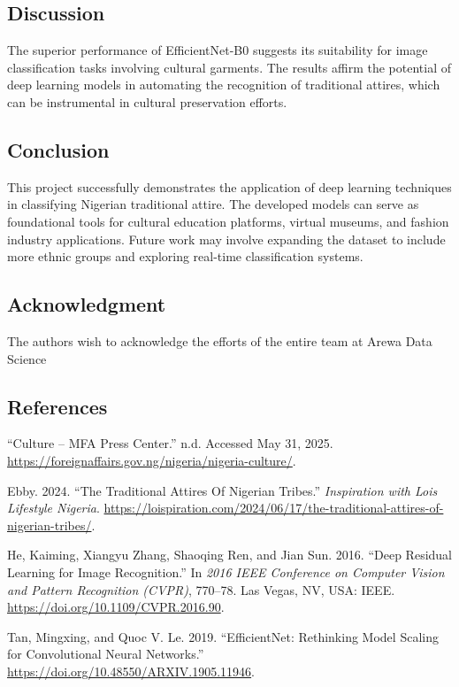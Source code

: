 \documentclass[
  letterpaper,
  DIV=11,
  numbers=noendperiod]{scrartcl}
\newlength{\cslhangindent}
\newenvironment{CSLReferences}[2] %
 {\begin{list}{}{%
  \setlength{\itemindent}{0pt}
  \setlength{\leftmargin}{0pt}
  \setlength{\parsep}{0pt}
  \ifodd #1
   \setlength{\leftmargin}{\cslhangindent}
   \setlength{\itemindent}{-1\cslhangindent}
  \fi
  \setlength{\itemsep}{#2\baselineskip}}}
 {\end{list}}
\begin{document}
\subsection{Discussion}\label{discussion}

The superior performance of EfficientNet-B0 suggests its suitability for
image classification tasks involving cultural garments. The results
affirm the potential of deep learning models in automating the
recognition of traditional attires, which can be instrumental in
cultural preservation efforts.

\subsection{Conclusion}\label{conclusion}

This project successfully demonstrates the application of deep learning
techniques in classifying Nigerian traditional attire. The developed
models can serve as foundational tools for cultural education platforms,
virtual museums, and fashion industry applications. Future work may
involve expanding the dataset to include more ethnic groups and
exploring real-time classification systems.

\subsection*{Acknowledgment}\label{acknowledgment}

The authors wish to acknowledge the efforts of the entire team at Arewa
Data Science

\subsection*{References}\label{references}

\label{refs}
\begin{CSLReferences}{1}{0}
{``Culture -- {MFA} {Press} {Center}.''} n.d. Accessed May 31, 2025.
\url{https://foreignaffairs.gov.ng/nigeria/nigeria-culture/}.

Ebby. 2024. {``The {Traditional} {Attires} {Of} {Nigerian} {Tribes}.''}
\emph{Inspiration with Lois{\textbar} Lifestyle {\textbar} Nigeria}.
\url{https://loispiration.com/2024/06/17/the-traditional-attires-of-nigerian-tribes/}.

He, Kaiming, Xiangyu Zhang, Shaoqing Ren, and Jian Sun. 2016. {``Deep
{Residual} {Learning} for {Image} {Recognition}.''} In \emph{2016 {IEEE}
{Conference} on {Computer} {Vision} and {Pattern} {Recognition}
({CVPR})}, 770--78. Las Vegas, NV, USA: IEEE.
\url{https://doi.org/10.1109/CVPR.2016.90}.

Tan, Mingxing, and Quoc V. Le. 2019. {``{EfficientNet}: {Rethinking}
{Model} {Scaling} for {Convolutional} {Neural} {Networks}.''}
\url{https://doi.org/10.48550/ARXIV.1905.11946}.

\end{CSLReferences}
\end{document}
